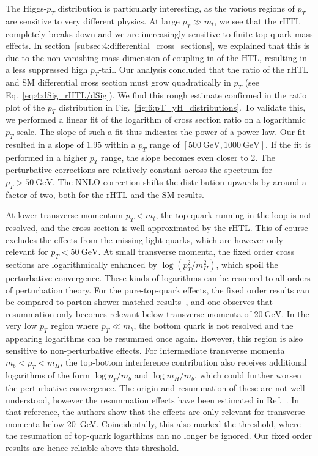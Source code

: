 The Higgs-$p_T$ distribution is particularly interesting, as the various regions of $p_T$ are sensitive to very different physics. At large $p_T \gg m_t$, we see that the \acs{rHTL} completely breaks down and we are increasingly sensitive to finite top-quark mass effects. In section~\ref{subsec:4:differential_cross_sections}, we explained that this is due to the non-vanishing mass dimension of coupling in of the \acs{HTL}, resulting in a less suppressed high $p_T$-tail. Our analysis concluded that the ratio of the \acs{rHTL} and \acs{SM} differential cross section must grow quadratically in $p_T$ (see Eq.~\eqref{eq:4:dSig_rHTL/dSig}). We find this rough estimate confirmed in the ratio plot of the $p_T$ distribution in Fig.~\ref{fig:6:pT_yH_distributions}. To validate this, we performed a linear fit of the logarithm of cross section ratio on a logarithmic $p_T$ scale. The slope of such a fit thus indicates the power of a power-law. Our fit resulted in a slope of $1.95$ within a $p_T$ range of $[500\ \mathrm{GeV}, 1000\ \mathrm{GeV}]$. If the fit is performed in a higher $p_T$ range, the slope becomes even closer to 2. The perturbative corrections are relatively constant across the spectrum for $p_T > 50\ \mathrm{GeV}$. The \acs{NNLO} correction shifts the distribution upwards by around a factor of two, both for the \acs{rHTL} and the \acs{SM} results.

At lower transverse momentum $p_T < m_t$, the top-quark running in the loop is not resolved, and the cross section is well approximated by the \acs{rHTL}. This of course excludes the effects from the missing light-quarks, which are however only relevant for $p_T < 50\ \mathrm{GeV}$. At small transverse momenta, the fixed order cross sections are logarithmically enhanced by $\log (p_T^2/m_H^2)$, which spoil the perturbative convergence. These kinds of logarithms can be resumed to all orders of perturbation theory. For the pure-top-quark effects, the fixed order results can be compared to parton shower matched results~\cite{Niggetiedt:2024nmp}, and one observes that resummation only becomes relevant below transverse momenta of $20\ \mathrm{GeV}$. In the very low $p_T$ region where $p_T \ll m_b$, the bottom quark is not resolved and the appearing logarithms can be resummed once again. However, this region is also sensitive to non-perturbative effects. For intermediate transverse momenta  $m_b < p_T < m_H$, the top-bottom interference contribution also receives additional logarithms of the form $\log p_T/m_b$ and $\log m_H/m_b$, which could further worsen the perturbative convergence. The origin and resummation of these are not well understood, however the resummation effects have been estimated in Ref.~\cite{Caola:2018zye}. In that reference, the authors show that the effects are only relevant for transverse momenta below 20~GeV. Coincidentally, this also marked the threshold, where the resumation of top-quark logarthims can no longer be ignored. Our fixed order results are hence reliable above this threshold.

